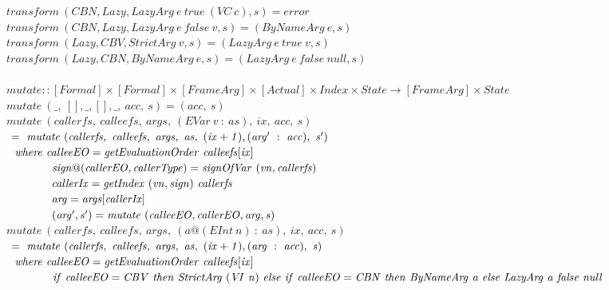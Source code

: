 \documentclass[diploma]{softlab-thesis}
\begin{document}
\begin{figure}[h]
  $\mathit{transform~(CBN, Lazy, LazyArg~e~true~(VC~c), s) = error}$ \\
  $\mathit{transform~(CBN, Lazy, LazyArg~e~false~v, s) = (ByNameArg~e, s)}$ \\
  $\mathit{transform~(Lazy, CBV, StrictArg~v, s) = (LazyArg~e~true~v, s)}$ \\
  $\mathit{transform~(Lazy, CBN, ByNameArg~e, s) = (LazyArg~e~false~null, s)}$ \\
  \\%
  $\mathit{mutate :: [Formal] \times [Formal] \times [FrameArg]
            \times [Actual] \times Index \times State \rightarrow [FrameArg] \times State} $ \\
  $\mathit{mutate~(\_,~[],\_,[],\_,~acc,~s)=(acc,~s)}$ \\
  $\mathit{mutate~(callerfs,~calleefs,~args,~(EVar~v~:~as),~ix,~acc,~s)}$ \\
  $\mathit{\hfill\ =~mutate~(callerfs,~calleefs,~args,~as,~(ix+1),(arg'~:~acc), ~s')}$ \\
  $\mathit{\hfill\ \hfill\ where~calleeEO=getEvaluationOrder~calleefs[ix]}$ \\
  $\mathit{\hfill\ \hfill\ \hfill\ \hfill\ \hfill\ \hfill\ \hfill\ \hfill\ \hfill\ \hfill\ \hfill\ \hfill\ 
            sign@(callerEO, callerType) = signOfVar~(vn, callerfs)}$ \\
  $\mathit{\hfill\ \hfill\ \hfill\ \hfill\ \hfill\ \hfill\ \hfill\ \hfill\ \hfill\ \hfill\ \hfill\ \hfill\ 
            callerIx = getIndex~(vn, sign)~callerfs}$ \\
  $\mathit{\hfill\ \hfill\ \hfill\ \hfill\ \hfill\ \hfill\ \hfill\ \hfill\ \hfill\ \hfill\ \hfill\ \hfill\ 
            arg = args[callerIx]}$ \\
  $\mathit{\hfill\ \hfill\ \hfill\ \hfill\ \hfill\ \hfill\ \hfill\ \hfill\ \hfill\ \hfill\ \hfill\ \hfill\ 
            (arg', s') = mutate~(calleeEO, callerEO, arg, s)}$ \\
  $\mathit{mutate~(callerfs,~calleefs,~args,~(a@(EInt~n)~:~as),~ix,~acc,~s)}$ \\
  $\mathit{\hfill\ =~mutate~(callerfs,~calleefs,~args,~as,~(ix+1),(arg~:~acc), ~s)}$ \\
  $\mathit{\hfill\ \hfill\ where~calleeEO=getEvaluationOrder~calleefs[ix]}$ \\
  $\mathit{\hfill\ \hfill\ \hfill\ \hfill\ \hfill\ \hfill\ \hfill\ \hfill\ \hfill\ \hfill\ \hfill\ \hfill\ 
      if~calleeEO=CBV~then~StrictArg~(VI~n)~else~if~calleeEO=CBN~then~ByNameArg~a~else~LazyArg~a~false~null}$ \\

\end{figure}
\end{document}
